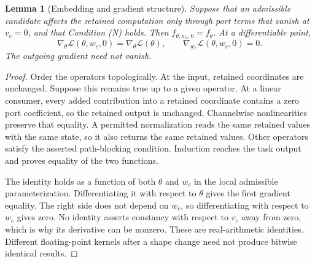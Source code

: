 \documentclass[10pt]{article}
\theoremstyle{paper}
\newtheorem{lemma}[theorem]{Lemma}
\newcommand{\Lcal}{\mathcal L}
\begin{document}
\begin{lemma}[Embedding and gradient structure]
\label{lem:embed}
Suppose that an admissible candidate affects the retained computation only through port terms that vanish at $v_c=0$, and that Condition (N) holds. Then $f_{\theta,w_c,0}=f_\theta$. At a differentiable point,
\[
\nabla_\theta\Lcal(\theta,w_c,0)=\nabla_\theta\Lcal(\theta),\qquad
\nabla_{w_c}\Lcal(\theta,w_c,0)=0.
\]
The outgoing gradient need not vanish.
\end{lemma}
\begin{proof}
Order the operators topologically. At the input, retained coordinates are unchanged. Suppose this remains true up to a given operator. At a linear consumer, every added contribution into a retained coordinate contains a zero port coefficient, so the retained output is unchanged. Channelwise nonlinearities preserve that equality. A permitted normalization reads the same retained values with the same state, so it also returns the same retained values. Other operators satisfy the asserted path-blocking condition. Induction reaches the task output and proves equality of the two functions.

The identity holds as a function of both $\theta$ and $w_c$ in the local admissible parameterization. Differentiating it with respect to $\theta$ gives the first gradient equality. The right side does not depend on $w_c$, so differentiating with respect to $w_c$ gives zero. No identity asserts constancy with respect to $v_c$ away from zero, which is why its derivative can be nonzero. These are real-arithmetic identities. Different floating-point kernels after a shape change need not produce bitwise identical results.
\end{proof}
\end{document}
